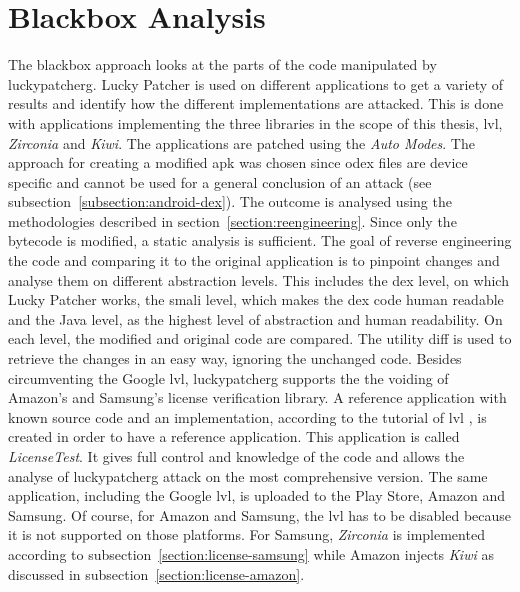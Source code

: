 \section{Blackbox Analysis} \label{section:luckypatcher-blackbox}
The blackbox approach looks at the parts of the code manipulated by \gls{luckypatcherg}.
Lucky Patcher is used on different applications to get a variety of results and identify how the different implementations are attacked.
This is done with applications implementing the three libraries in the scope of this thesis, \gls{lvl}, \textit{Zirconia} and \textit{Kiwi}.
\newline
The applications are patched using the \textit{Auto Modes}.
The approach for creating a modified \gls{apk} was chosen since \gls{odex} files are device specific and cannot be used for a general conclusion of an attack (see subsection~\ref{subsection:android-dex}).
The outcome is analysed using the methodologies described in  section~\ref{section:reengineering}.
Since only the bytecode is modified, a static analysis is sufficient.
\newline
The goal of reverse engineering the code and comparing it to the original application is to pinpoint changes and analyse them on different abstraction levels.
This includes the \gls{dex} level, on which Lucky Patcher works, the smali level, which makes the \gls{dex} code human readable and the Java level, as the highest level of abstraction and human readability.
On each level, the modified and original code are compared.
The utility diff is used to retrieve the changes in an easy way, ignoring the unchanged code.
\newline
\newline
Besides circumventing the Google \gls{lvl}, \gls{luckypatcherg} supports the the voiding of Amazon's and Samsung's license verification library.
A reference application with known source code and an implementation, according to the tutorial of \gls{lvl} \cite{developersLicensingAdding}, is created in order to have a reference application.
This application is called \textit{LicenseTest}.
It gives full control and knowledge of the code and allows the analyse of \gls{luckypatcherg} attack on the most comprehensive version.
The same application, including the Google \gls{lvl}, is uploaded to the Play Store, Amazon and Samsung. Of course, for Amazon and Samsung, the \gls{lvl} has to be disabled because it is not supported on those platforms.
For Samsung, \textit{Zirconia} is implemented according to subsection~\ref{section:license-samsung} while Amazon injects \textit{Kiwi} as discussed in subsection~\ref{section:license-amazon}.
